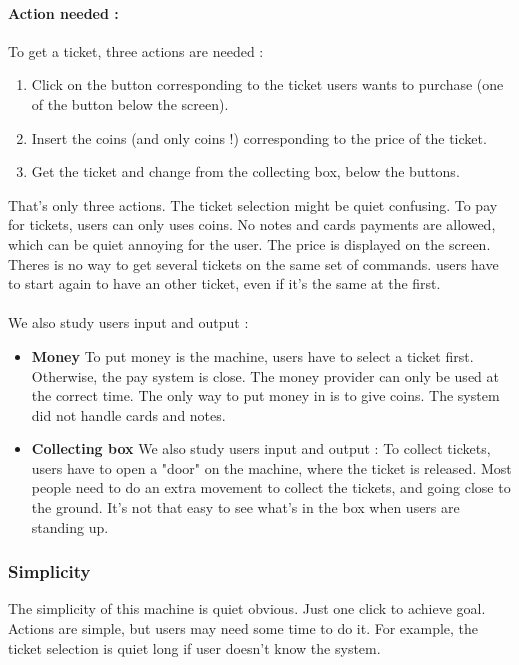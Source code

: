\documentclass[a4paper,12pt]{article} %
\begin{document}
\paragraph{Action needed : } To get a ticket, three actions are needed : 
\begin{enumerate}
\item Click on the button corresponding to the ticket users wants to purchase (one of the button below the screen).
\item Insert the coins (and only coins !) corresponding to the price of the ticket.
\item Get the ticket and change from the collecting box, below the buttons.
\end{enumerate}
That's only three actions. The ticket selection might be quiet confusing. To pay for tickets, users can only uses coins. No notes and cards payments are allowed, which can be quiet annoying for the user. The price is displayed on the screen. Theres is no way to get several tickets on the same set of commands. users have to start again to have an other ticket, even if it's the same at the first.

\paragraph{}We also study users input and output : 
\begin{itemize}
\item \textbf{Money}
To put money is the machine, users have to select a ticket first. Otherwise, the pay system is close. The money provider can only be used at the correct time. The only way to put money in is to give coins. The system did not handle cards and notes.
\item \textbf{Collecting box}
We also study users input and output : 
To collect tickets, users have to open a "door" on the machine, where the ticket is released. Most people need to do an extra movement to collect the tickets, and going close to the ground. It's not that easy to see what's in the box when users are standing up.
\end{itemize}
\subsubsection{Simplicity}
The simplicity of this machine is quiet obvious. Just one click to achieve goal. Actions are simple, but users may need some time to do it. For example,  the ticket selection is quiet long if user doesn't know the system.
\end{document}
